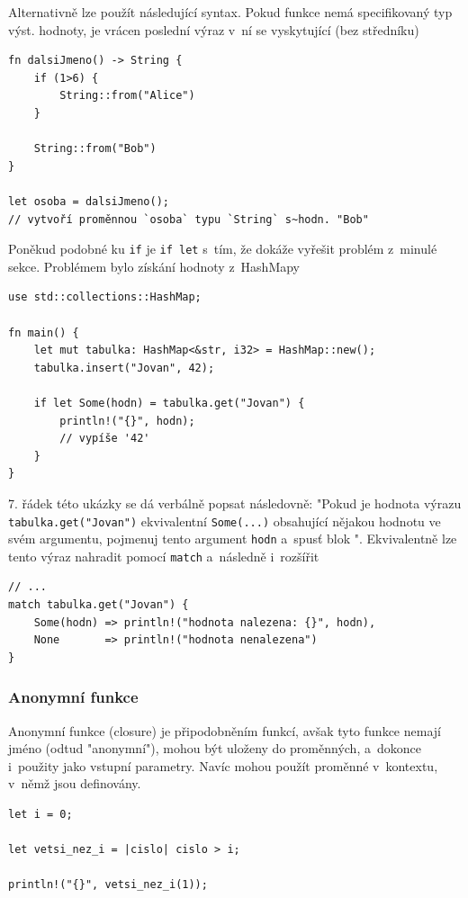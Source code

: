 \documentclass[a4paper, 12pt]{article} %
\newcommand{\rust}[1]{\texttt{#1}}
\begin{document}
        Alternativně lze použít následující syntax. Pokud funkce nemá specifikovaný typ výst. hodnoty, je vrácen poslední výraz v~ní se vyskytující (bez středníku)
        \begin{verbatim}
fn dalsiJmeno() -> String {
    if (1>6) {
        String::from("Alice")
    }

    String::from("Bob")
}

let osoba = dalsiJmeno();
// vytvoří proměnnou `osoba` typu `String` s~hodn. "Bob"
        \end{verbatim}
        
        Poněkud podobné ku \rust{if} je \rust{if let} s~tím, že dokáže vyřešit problém z~minulé sekce. Problémem bylo získání hodnoty z~HashMapy
        \begin{verbatim}
use std::collections::HashMap;

fn main() {
    let mut tabulka: HashMap<&str, i32> = HashMap::new();
    tabulka.insert("Jovan", 42); 
    
    if let Some(hodn) = tabulka.get("Jovan") {
        println!("{}", hodn);
        // vypíše '42'
    }
}
        \end{verbatim}
        
        7. řádek této ukázky se dá verbálně popsat následovně: "Pokud je hodnota výrazu \rust{tabulka.get("Jovan")} ekvivalentní \rust{Some(...)} obsahující nějakou hodnotu ve svém argumentu, pojmenuj tento argument \texttt{hodn} a~spusť blok \texttt{\string{\dots\string}}". Ekvivalentně lze tento výraz nahradit pomocí \rust{match} a~následně i~rozšířit
        \begin{verbatim}
// ...
match tabulka.get("Jovan") {
    Some(hodn) => println!("hodnota nalezena: {}", hodn),
    None       => println!("hodnota nenalezena")
}
        \end{verbatim}
        
        \subsubsection*{Anonymní funkce}
            Anonymní funkce (closure) je připodobněním funkcí, avšak tyto funkce nemají jméno (odtud "anonymní"), mohou být uloženy do proměnných, a~dokonce i~použity jako vstupní parametry. Navíc mohou použít proměnné v~kontextu, v~němž jsou definovány.
            \begin{verbatim}
let i = 0;

let vetsi_nez_i = |cislo| cislo > i;

println!("{}", vetsi_nez_i(1));
            \end{verbatim}
            
\end{document}
